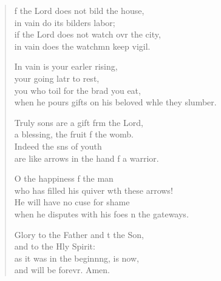 \settowidth{\versewidth}{when he pours gifts on his beloved while they slumber.}
\begin{verse}%
  \begin{patverse}
f the Lord does not bild the house,\Med\\
in vain do its bilders labor;\\
if the Lord does not watch ovr the city,\Med\\
in vain does the watchmn keep vigil.

In vain is your earl\pointup{\i}er rising,\Med\\
your going latr to rest,\\
you who toil for the brad you eat,\Med\\
when he pours gifts on his beloved wh\pointup{\i}le they slumber.

Truly sons are a gift frm the Lord,\Med\\
a blessing, the fruit f the womb.\\
Indeed the sns of youth\Med\\
are like arrows in the hand f a warrior.

O the happiness f the man\Med\\
who has filled his quiver w\pointup{\i}th these arrows!\\
He will have no cuse for shame\Med\\
when he disputes with his foes \pointup{\i}n the gateways.

Glory to the Father and t the Son,\Med\\
and to the Hly Spirit:\\
as it was in the beginn\pointup{\i}ng, is now,\Med\\
and will be forevr. Amen. 
  \end{patverse}
\end{verse}

